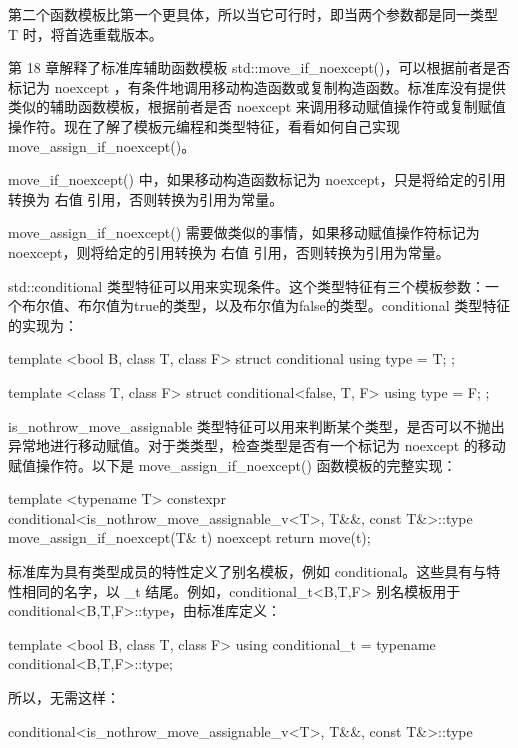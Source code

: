 第二个函数模板比第一个更具体，所以当它可行时，即当两个参数都是同一类型 T 时，将首选重载版本。


第 18 章解释了标准库辅助函数模板 std::move\_if\_noexcept()，可以根据前者是否标记为 noexcept ，有条件地调用移动构造函数或复制构造函数。标准库没有提供类似的辅助函数模板，根据前者是否 noexcept 来调用移动赋值操作符或复制赋值操作符。现在了解了模板元编程和类型特征，看看如何自己实现 move\_assign\_if\_noexcept()。

move\_if\_noexcept() 中，如果移动构造函数标记为 noexcept，只是将给定的引用转换为 右值 引用，否则转换为引用为常量。

move\_assign\_if\_noexcept() 需要做类似的事情，如果移动赋值操作符标记为 noexcept，则将给定的引用转换为 右值 引用，否则转换为引用为常量。

std::conditional 类型特征可以用来实现条件。这个类型特征有三个模板参数：一个布尔值、布尔值为true的类型，以及布尔值为false的类型。conditional 类型特征的实现为：

\begin{cpp}
template <bool B, class T, class F>
struct conditional { using type = T; };

template <class T, class F>
struct conditional<false, T, F> { using type = F; };
\end{cpp}

is\_nothrow\_move\_assignable 类型特征可以用来判断某个类型，是否可以不抛出异常地进行移动赋值。对于类类型，检查类型是否有一个标记为 noexcept 的移动赋值操作符。以下是 move\_assign\_if\_noexcept() 函数模板的完整实现：

\begin{cpp}
template <typename T>
constexpr conditional<is_nothrow_move_assignable_v<T>, T&&, const T&>::type
    move_assign_if_noexcept(T& t) noexcept
{
    return move(t);
}
\end{cpp}

标准库为具有类型成员的特性定义了别名模板，例如 conditional。这些具有与特性相同的名字，以 \_t 结尾。例如，conditional\_t<B,T,F> 别名模板用于 conditional<B,T,F>::type，由标准库定义：

\begin{cpp}
template <bool B, class T, class F>
using conditional_t = typename conditional<B,T,F>::type;
\end{cpp}

所以，无需这样：

\begin{cpp}
conditional<is_nothrow_move_assignable_v<T>, T&&, const T&>::type
\end{cpp}

